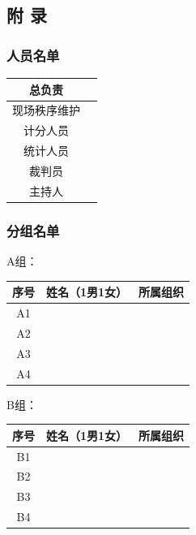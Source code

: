 \documentclass{article}
\begin{document}
\begin{CJK}{UTF8}{gbsn}
\begin{table}[htbp]
\begin{tabular}{|c|c|c|c|}
\end{tabular}
\end{table}

\subsection{附 录}
\subsubsection{人员名单}
\begin{table}[htbp]
	\centering
	\begin{tabular}{|c|c|}
		\hline	
总负责	& \hspace{20em} \\\hline
现场秩序维护	& \\\hline
计分人员	& \\\hline
统计人员	& \\\hline
裁判员	& \\\hline
主持人	& \\\hline
\end{tabular}
\end{table}

\subsubsection{分组名单}

\begin{table}[htbp]
	A组：
	\centering
	\begin{tabular}{|c|c|c|}
		\hline	
		序号& 姓名（1男1女）& 	所属组织\\\hline
		A1	&&\\\hline
		A2	&&	\\\hline
		A3	&&	\\\hline
		A4	&&\\\hline
	\end{tabular}
\end{table}


\begin{table}[htbp]
	B组：\centering
	\begin{tabular}{|c|c|c|}
		\hline	
		序号& 姓名（1男1女）& 	所属组织\\\hline
		B1	&&\\\hline
		B2	&&	\\\hline
		B3	&&	\\\hline
		B4	&&\\\hline
	\end{tabular}
\end{table}



\end{CJK}
\end{document}
